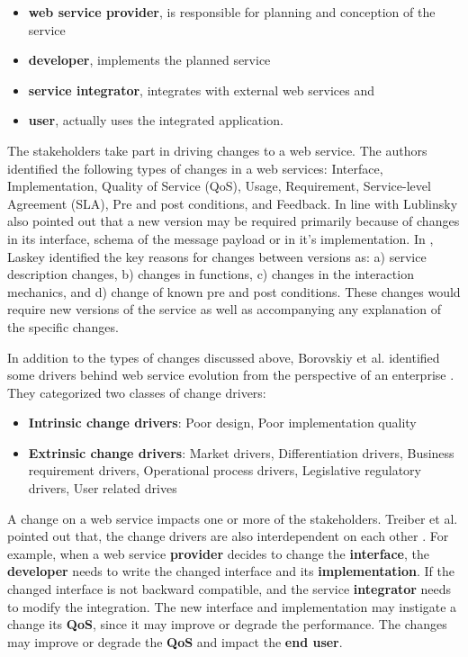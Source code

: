 \documentclass[runningheads,a4paper]{llncs}
\begin{document}
\begin{itemize}
  \item \textbf{web service provider}, is responsible for planning and conception of the service
  \item \textbf{developer}, implements the planned service
  \item \textbf{service integrator}, integrates with external web services and
  \item \textbf{user}, actually uses the integrated application.
\end{itemize}

The stakeholders take part in driving changes to a web service. The authors identified the following types of changes in a web services: Interface, Implementation, Quality of Service (QoS), Usage, Requirement, Service-level Agreement (SLA), Pre and post conditions, and Feedback. In line with \cite{treiber2009analyzing}  Lublinsky also pointed out that a new version may be required primarily because of changes in its interface, schema of the message payload or in it’s implementation. In \cite{laskey2008considerations}, Laskey identified the key reasons for changes between versions as: a) service description changes, b) changes in functions, c) changes in the interaction mechanics, and d) change of known pre and post conditions. These changes would require new versions of the service as well as accompanying any explanation of the specific changes.

In addition to the types of changes discussed above, Borovskiy et al. identified some drivers behind web service evolution from the perspective of an enterprise \cite{borovskiy2008evolution}. They categorized two classes of change drivers:

\begin{itemize}
  \item \textbf{Intrinsic change drivers}: Poor design, Poor implementation quality
  \item \textbf{Extrinsic change drivers}: Market drivers, Differentiation drivers, Business requirement drivers, Operational process drivers, Legislative regulatory drivers, User related drives
\end{itemize}


A change on a web service impacts one or more of the stakeholders. Treiber et al. pointed out that, the change drivers are also interdependent on each other \cite{treiber2009analyzing}. For example, when a web service \textbf{provider} decides to change the \textbf{interface}, the \textbf{developer} needs to write the changed interface and its \textbf{implementation}. If the changed interface is not backward compatible, and the service \textbf{integrator} needs to modify the integration. The new interface and implementation may instigate a change its \textbf{QoS}, since it may improve or degrade the performance. The changes may improve or degrade the \textbf{QoS} and impact the \textbf{end user}.
\end{document}
